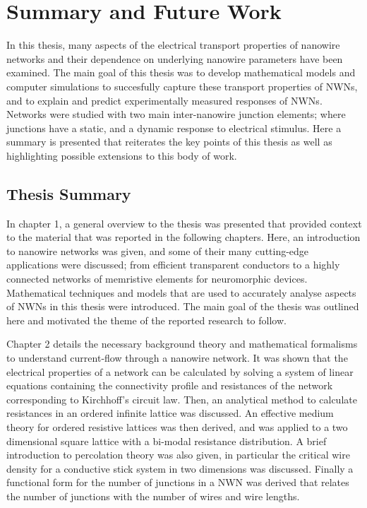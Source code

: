 \chapter{Summary and Future Work}

In this thesis, many aspects of the electrical transport properties of nanowire networks and their dependence on underlying nanowire parameters have been examined. The main goal of this thesis was to develop mathematical models and computer simulations to succesfully capture these transport properties of NWNs, and to explain and predict experimentally measured responses of NWNs. Networks were studied with two main inter-nanowire junction elements; where junctions have a static, and a dynamic response to electrical stimulus. Here a summary is presented that reiterates the key points of this thesis as well as highlighting possible extensions to this body of work.
\section{Thesis Summary}
In chapter 1, a general overview to the thesis was presented that provided context to the material that was reported in the following chapters. Here, an introduction to nanowire networks was given, and some of their many cutting-edge applications were discussed; from efficient transparent conductors to a highly connected networks of memristive elements for neuromorphic devices. Mathematical techniques and models that are used to accurately analyse aspects of NWNs in this thesis were introduced. The main goal of the thesis was outlined here and motivated the theme of the reported research to follow.

Chapter 2 details the necessary background theory and mathematical formalisms to understand current-flow through a nanowire network. It was shown that the electrical properties of a network can be calculated by solving a system of linear equations containing the connectivity profile and resistances of the network corresponding to Kirchhoff's circuit law. Then, an analytical method to calculate resistances in an ordered infinite lattice was discussed. An effective medium theory for ordered resistive lattices was then derived, and was applied to a two dimensional square lattice with a bi-modal resistance distribution. A brief introduction to percolation theory was also given, in particular the critical wire density for a conductive stick system in two dimensions was discussed. Finally a functional form for the number of junctions in a NWN was derived that relates the number of junctions with the number of wires and wire lengths.  

